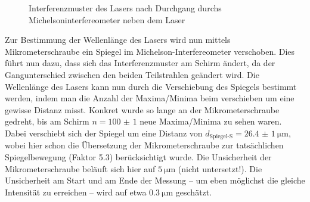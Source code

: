 \documentclass[ngerman]{scrartcl}
\begin{document}
\begin{figure}[H]
\begin{minipage}[t]{0.45\linewidth}
        \caption{Interferenzmuster des Lasers nach Durchgang durchs Michelsoninterfereometer neben dem Laser}
        \label{fig:michelson_konz_sammel_tuer}
    \end{minipage}
\end{figure}
\setcaphanging

Zur Bestimmung der Wellenlänge des Lasers wird nun mittels Mikrometerschraube ein Spiegel im Michelson-Interfereometer verschoben. Dies führt nun dazu, dass sich das Interferenzmuster am Schirm ändert, da der Gangunterschied zwischen den beiden Teilstrahlen geändert wird. Die Wellenlänge des Lasers kann nun durch die Verschiebung des Spiegels bestimmt werden, indem man die Anzahl der Maxima/Minima beim verschieben um eine gewisse Distanz misst. Konkret wurde so lange an der Mikrometerschraube gedreht, bis am Schirm $n = \num{100(1)}$ neue Maxima/Minima zu sehen waren. Dabei verschiebt sich der Spiegel um eine Distanz von $d_\text{Spiegel-S} = \SI{26.4(10)}{\micro\meter}$, wobei hier schon die Übersetzung der Mikrometerschraube zur tatsächlichen Spiegelbewegung (Faktor \num{5.3}) berücksichtigt wurde. Die Unsicherheit der Mikrometerschraube beläuft sich hier auf $\SI{5}{\micro\meter}$ (nicht untersetzt!). Die Unsicherheit am Start und am Ende der Messung -- um eben möglichst die gleiche Intensität zu erreichen -- wird auf etwa $\SI{0.3}{\micro\meter}$ geschätzt.
\end{document}
